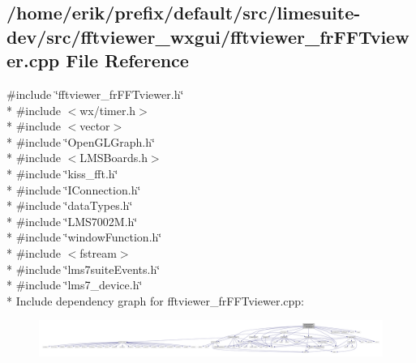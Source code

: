 \subsection{/home/erik/prefix/default/src/limesuite-\/dev/src/fftviewer\+\_\+wxgui/fftviewer\+\_\+fr\+F\+F\+Tviewer.cpp File Reference}
\label{fftviewer__frFFTviewer_8cpp}
{\ttfamily \#include \char`\"{}fftviewer\+\_\+fr\+F\+F\+Tviewer.\+h\char`\"{}}\\*
{\ttfamily \#include $<$wx/timer.\+h$>$}\\*
{\ttfamily \#include $<$vector$>$}\\*
{\ttfamily \#include \char`\"{}Open\+G\+L\+Graph.\+h\char`\"{}}\\*
{\ttfamily \#include $<$L\+M\+S\+Boards.\+h$>$}\\*
{\ttfamily \#include \char`\"{}kiss\+\_\+fft.\+h\char`\"{}}\\*
{\ttfamily \#include \char`\"{}I\+Connection.\+h\char`\"{}}\\*
{\ttfamily \#include \char`\"{}data\+Types.\+h\char`\"{}}\\*
{\ttfamily \#include \char`\"{}L\+M\+S7002\+M.\+h\char`\"{}}\\*
{\ttfamily \#include \char`\"{}window\+Function.\+h\char`\"{}}\\*
{\ttfamily \#include $<$fstream$>$}\\*
{\ttfamily \#include \char`\"{}lms7suite\+Events.\+h\char`\"{}}\\*
{\ttfamily \#include \char`\"{}lms7\+\_\+device.\+h\char`\"{}}\\*
Include dependency graph for fftviewer\+\_\+fr\+F\+F\+Tviewer.\+cpp\+:
\nopagebreak
\begin{figure}[H]
\begin{center}
\leavevmode
\includegraphics[width=350pt]{d1/dd0/fftviewer__frFFTviewer_8cpp__incl}
\end{center}
\end{figure}
